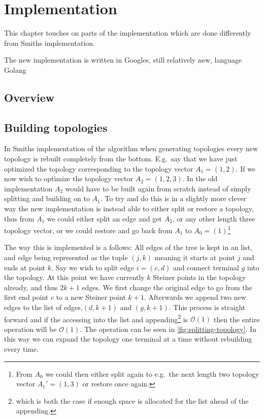  {
\abnormalparskip{0pt}
\chapter{Implementation}
\label{cha:implementation}
}

This chapter touches on parts of the implementation which are done differently
from Smiths implementation.

The new implementation is written in Googles, still relatively new, language
Golang~\cite{golanghomepage}

\section{Overview}
\label{sec:overview-1}


\section{Building topologies}
\label{sec:building-topologies}

In Smiths implementation of the algorithm when generating topologies every new
topology is rebuilt completely from the bottom. E.g.\ say that we have just
optimized the topology corresponding to the topology vector $A_1 = (1, 2)$. If we
now wish to optimize the topology vector $A_2 = (1, 2, 3)$. In the old
implementation $A_2$ would have to be built again from scratch instead of simply
splitting and building on to $A_1$. To try and do this is in a slightly more
clever way the new implementation is instead able to either split or restore a
topology, thus from $A_1$ we could either split an edge and get $A_2$, or any
other length three topology vector, or we could restore and go back from $A_1$
to $A_0 = (1)$\footnote{From $A_0$ we could then either split again to e.g.\ the
next length two topology vector $A_1' = (1, 3)$ or restore once again.}

The way this is implemented is a follows: All edges of the tree is kept in an
list, and edge being represented as the tuple $(j, k)$ meaning it starts at
point $j$ and ends at point $k$. Say we wish to split edge $i = (c,d)$ and
connect terminal $g$ into the topology. At this point we have currently $k$
Steiner points in the topology already, and thus $2k+1$ edges. We first change
the original edge to go from the first end point $c$ to a new Steiner point
$k+1$. Afterwards we append two new edges to the list of edges,$(d, k+1)$ and
$(g, k+1)$. This process is straight forward and if the accessing into the list
and appending\footnote{which is both the case if enough space is allocated for
  the list ahead of the appending.} is $\mathcal{O}(1)$ then the entire
operation will be $\mathcal{O}(1)$. The operation can be seen in
\cref{fig:splitting-topology}. In this way we can expand the topology one
terminal at a time without rebuilding every time.

